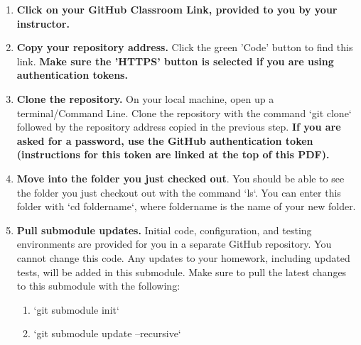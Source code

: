 \documentclass{article} %
\begin{document}

\rickroll



\begin{enumerate} 
    \item \textbf{Click on your GitHub Classroom Link, provided to you by your instructor.}
    
    \item \textbf{Copy your repository address.} Click the green 'Code' button to find this link.  \textbf{Make sure the 'HTTPS' button is selected if you are using authentication tokens.}    
    
    \item \textbf{Clone the repository.}  On your local machine, open up a terminal/Command Line.  Clone the repository with the command `git clone` followed by the repository address copied in the previous step.  \textbf{If you are asked for a password, use the GitHub authentication token (instructions for this token are linked at the top of this PDF).}
    

    \item \textbf{Move into the folder you just checked out}.  You should be able to see the folder you just checkout out with the command `ls`.  You can enter this folder with `cd foldername`, where foldername is the name of your new folder.
    
    \item \textbf{Pull submodule updates.}  Initial code, configuration, and testing environments are provided for you in a separate GitHub repository.  You cannot change this code.  Any updates to your homework, including updated tests, will be added in this submodule.  Make sure to pull the latest changes to this submodule with the following:
    \begin{enumerate}
        \item `git submodule init`
        \item `git submodule update --recursive`
    \end{enumerate}
\end{enumerate}
\end{document}
